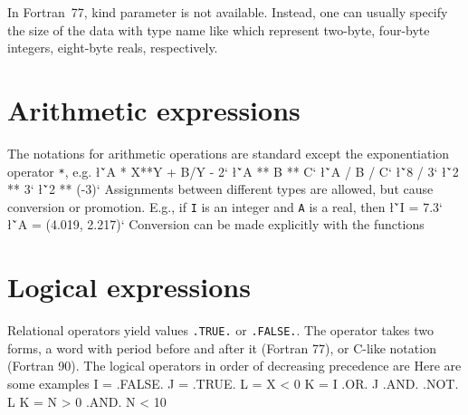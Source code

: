 {In Fortran~77, kind parameter is not available.  Instead, one can
usually specify the size of the data with type name like 
\sms
{}
\sms
which represent two-byte, four-byte integers, eight-byte reals,
respectively. 

\goodbreak
\section{Arithmetic expressions}
The notations for arithmetic operations are standard except the 
exponentiation operator {\tt **}, e.g.
\sms
\l{\v`A * X**Y + B/Y - 2`}
\l{\v`A ** B ** C`}
\l{\v`A / B / C`}
\l{\v`8 / 3`}
\l{\v`2 ** 3`}
\l{\v`2 ** (-3)`}
\sms
Assignments between different types are allowed, but cause 
conversion or promotion.  E.g., if {\tt I} is an integer and {\tt A} is
a real, then
\sms
\l{\v`I = 7.3`}
\l{\v`A = (4.019, 2.217)`}
\sms
Conversion can be made explicitly with the functions
\sms
{}
\sms

\section{Logical expressions}
Relational operators yield values {\tt .TRUE.} or {\tt .FALSE.}.
The operator takes two forms, a word with period before and after it
(Fortran 77), or C-like notation (Fortran 90).
\sms
{}
\sms
The logical operators in order of decreasing precedence are
\sms
\vbox{
}
\sms
Here are some examples
\ttbg
I = .FALSE.
J = .TRUE.
L = X < 0
K = I .OR. J .AND. .NOT. L
K = N > 0 .AND. N < 10
\tted

}

